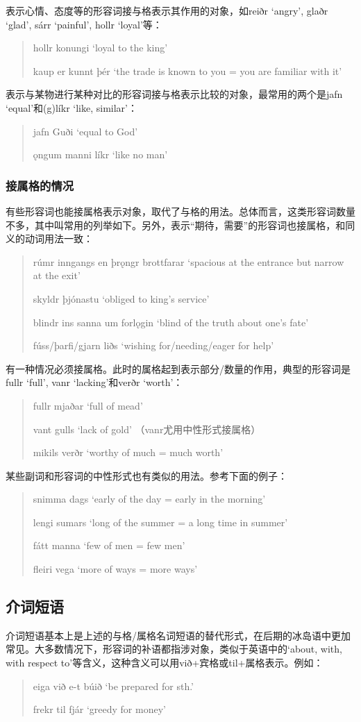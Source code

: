 表示心情、态度等的形容词接与格表示其作用的对象，如reiðr `angry', glaðr `glad', sárr `painful', hollr `loyal'等：
\begin{quote}
    hollr konungi `loyal to the king'

    kaup er kunnt þér `the trade is known to you = you are familiar with it'
\end{quote}

表示与某物进行某种对比的形容词接与格表示比较的对象，最常用的两个是jafn `equal'和(g)líkr `like, similar'：
\begin{quote}
    jafn Guði `equal to God'

    ǫngum manni líkr `like no man'
\end{quote}
\subsubsection*{接属格的情况}
有些形容词也能接属格表示对象，取代了与格的用法。总体而言，这类形容词数量不多，其中叫常用的列举如下。另外，表示“期待，需要”的形容词也接属格，和同义的动词用法一致：
\begin{quote}
    rúmr inngangs en þrǫngr brottfarar `spacious at the entrance but narrow at the exit'

    skyldr þjónastu `obliged to king's service'

    blindr ins sanna um forlǫgin `blind of the truth about one's fate'

    fúss/þarfi/gjarn liðs `wishing for/needing/eager for help'
\end{quote}
有一种情况必须接属格。此时的属格起到表示部分/数量的作用，典型的形容词是fullr `full', vanr `lacking'和verðr `worth'：
\begin{quote}
    fullr mjaðar `full of mead'

    vant gulls `lack of gold' （vanr尤用中性形式接属格）

    mikils verðr `worthy of much = much worth'
\end{quote}
某些副词和形容词的中性形式也有类似的用法。参考下面的例子：
\begin{quote}
    snimma dags `early of the day = early in the morning'

    lengi sumars `long of the summer = a long time in summer'

    fátt manna `few of men = few men'

    fleiri vega `more of ways = more ways'
\end{quote}

\subsection{介词短语}
介词短语基本上是上述的与格/属格名词短语的替代形式，在后期的冰岛语中更加常见。大多数情况下，形容词的补语都指涉对象，类似于英语中的`about, with, with respect to'等含义，这种含义可以用við+宾格或til+属格表示。例如：
\begin{quote}
    eiga við e-t búið `be prepared for sth.'

    frekr til fjár `greedy for money'
\end{quote}

